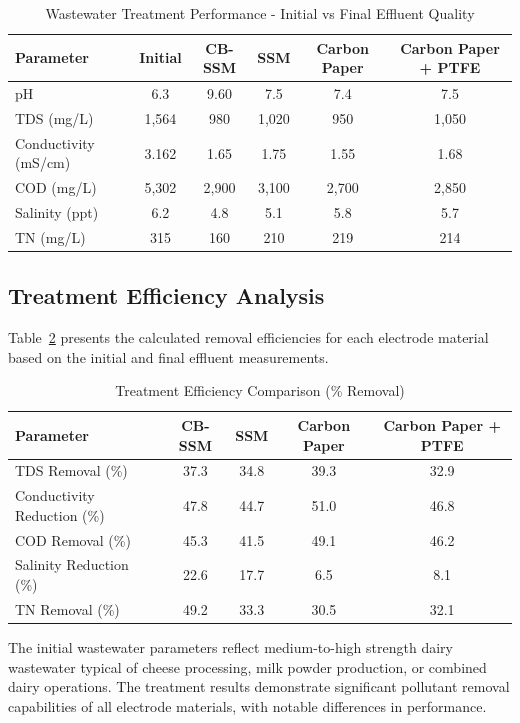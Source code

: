 \documentclass[12pt,a4paper]{article}
\begin{document}
\begin{table}[H]
\centering
\caption{Wastewater Treatment Performance - Initial vs Final Effluent Quality}
\label{tab:wastewater_params}
\begin{tabular}{@{}lccccc@{}}
\toprule
\textbf{Parameter} & \textbf{Initial} & \textbf{CB-SSM} & \textbf{SSM} & \textbf{Carbon Paper} & \textbf{Carbon Paper + PTFE} \\
\midrule
pH & 6.3 & 9.60 & 7.5 & 7.4 & 7.5 \\
TDS (mg/L) & 1,564 & 980 & 1,020 & 950 & 1,050 \\
Conductivity (mS/cm) & 3.162 & 1.65 & 1.75 & 1.55 & 1.68 \\
COD (mg/L) & 5,302 & 2,900 & 3,100 & 2,700 & 2,850 \\
Salinity (ppt) & 6.2 & 4.8 & 5.1 & 5.8 & 5.7 \\
TN (mg/L) & 315 & 160 & 210 & 219 & 214 \\
\bottomrule
\end{tabular}
\end{table}

\subsection{Treatment Efficiency Analysis}

Table~\ref{tab:treatment_efficiency} presents the calculated removal efficiencies for each electrode material based on the initial and final effluent measurements.

\begin{table}[H]
\centering
\caption{Treatment Efficiency Comparison (\% Removal)}
\label{tab:treatment_efficiency}
\begin{tabular}{@{}lcccc@{}}
\toprule
\textbf{Parameter} & \textbf{CB-SSM} & \textbf{SSM} & \textbf{Carbon Paper} & \textbf{Carbon Paper + PTFE} \\
\midrule
TDS Removal (\%) & 37.3 & 34.8 & 39.3 & 32.9 \\
Conductivity Reduction (\%) & 47.8 & 44.7 & 51.0 & 46.8 \\
COD Removal (\%) & 45.3 & 41.5 & 49.1 & 46.2 \\
Salinity Reduction (\%) & 22.6 & 17.7 & 6.5 & 8.1 \\
TN Removal (\%) & 49.2 & 33.3 & 30.5 & 32.1 \\
\bottomrule
\end{tabular}
\end{table}

The initial wastewater parameters reflect medium-to-high strength dairy wastewater typical of cheese processing, milk powder production, or combined dairy operations. The treatment results demonstrate significant pollutant removal capabilities of all electrode materials, with notable differences in performance.
\end{document}
